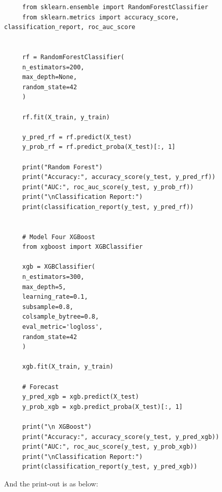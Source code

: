 \documentclass[letterpaper]{article}
\begin{document}
\begin{lstlisting}
     from sklearn.ensemble import RandomForestClassifier
     from sklearn.metrics import accuracy_score, classification_report, roc_auc_score
     
     
     rf = RandomForestClassifier(
     n_estimators=200,
     max_depth=None,
     random_state=42
     )
     
     rf.fit(X_train, y_train)
     
     y_pred_rf = rf.predict(X_test)
     y_prob_rf = rf.predict_proba(X_test)[:, 1]
     
     print("Random Forest")
     print("Accuracy:", accuracy_score(y_test, y_pred_rf))
     print("AUC:", roc_auc_score(y_test, y_prob_rf))
     print("\nClassification Report:")
     print(classification_report(y_test, y_pred_rf))
     
     
     # Model Four XGBoost
     from xgboost import XGBClassifier
     
     xgb = XGBClassifier(
     n_estimators=300,
     max_depth=5,
     learning_rate=0.1,
     subsample=0.8,
     colsample_bytree=0.8,
     eval_metric='logloss',
     random_state=42
     )
     
     xgb.fit(X_train, y_train)
     
     # Forecast
     y_pred_xgb = xgb.predict(X_test)
     y_prob_xgb = xgb.predict_proba(X_test)[:, 1]
     
     print("\n XGBoost")
     print("Accuracy:", accuracy_score(y_test, y_pred_xgb))
     print("AUC:", roc_auc_score(y_test, y_prob_xgb))
     print("\nClassification Report:")
     print(classification_report(y_test, y_pred_xgb))
\end{lstlisting}

And the print-out is as below:
\end{document}
